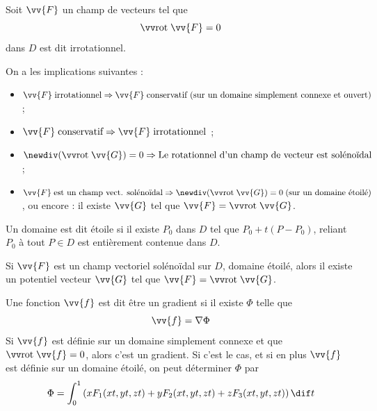 \begin{mydef} Soit $\vv{F}$ un champ de vecteurs tel que
	\[ \rot \vv{F} = 0 \]
	dans $D$ est dit irrotationnel.
\end{mydef}

\begin{myprop} On a les implications suivantes :
	\begin{itemize}
		\item $ \vv{F} \; \text{irrotationnel} \Rightarrow \vv{F} \; \text{conservatif (sur un domaine simplement connexe et ouvert)} $ ;
		\item $ \vv{F} \;\text{conservatif} \Rightarrow \vv{F} \;\text{irrotationnel} $ ;
		\item $ \newdiv (\rot \vv{G}) = 0  \Rightarrow \text{Le rotationnel d'un champ de vecteur est solénoïdal} $ ;
		\item $ \vv{F} \;\text{est un champ vect. solénoïdal} \Rightarrow \newdiv (\rot \vv{G}) = 0 \;\text{(sur un domaine étoilé)} $, ou encore : il existe $\vv{G}$ tel que $\vv{F} = \rot \vv{G}$.
	\end{itemize}
\end{myprop}

\begin{mydef}
	Un domaine est dit étoile si il existe $P_0$ dans $D$ tel que $P_0 + t(P - P_0)$, reliant $P_0$ à tout $P \in D$ est entièrement contenue dans $D$.
\end{mydef}

\begin{myprop}
	Si $\vv{F}$ est un champ vectoriel solénoïdal sur $D$, domaine étoilé, alors il existe un potentiel vecteur $\vv{G}$ tel que $\vv{F} = \rot \vv{G}$.
\end{myprop}

\begin{myform}
	Une fonction $\vv{f}$ est dit être un gradient si il existe $\Phi$ telle que
	\[ \vv{f} = \nabla \Phi \]
	Si $\vv{f}$ est définie sur un domaine simplement connexe et que $\rot \vv{f} = 0$, alors c'est un gradient.
	Si c'est le cas, et si en plus $\vv{f}$ est définie sur un domaine étoilé, on peut déterminer $\Phi$ par
	\[ \Phi = \int_0^1 \left( x F_1(xt,yt,zt) + y F_2(xt,yt,zt) + z F_3(xt,yt,zt) \right) \dif t \]
\end{myform}

